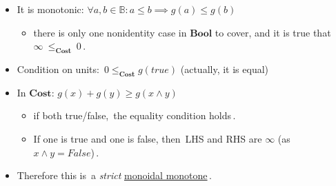 \begin{itemize}
    \item  It is monotonic:  $\forall a,b \in \mathbb{B}: a\leq b \implies g(a)\leq g(b)$
          \begin{itemize}
            \item there is only one nonidentity case in $\mathbf{Bool}$ to cover, and it is true that \,$\infty\ \leq_\mathbf{Cost}\ 0$\,.
          \end{itemize}
    \item Condition on units: \,$0 \leq_\mathbf{Cost} g(true)$ (actually, it is equal)\,
    \item In $\mathbf{Cost}$: $g(x) + g(y) \geq g(x \land y)$
          \begin{itemize}
            \item if both true/false, \,the equality condition holds\,.
            \item If one is true and one is false, then \,LHS and RHS are $\infty$ (as $x \land y = False$)\,.
          \end{itemize}
    \item Therefore this is \,a \emph{strict} \hyperref[D2.41]{monoidal monotone}\,.

  \end{itemize}
